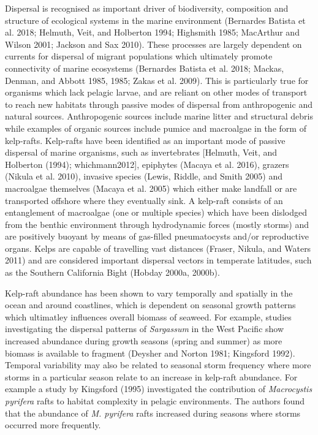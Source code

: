 \documentclass[
]{article}
\begin{document}
Dispersal is recognised as important driver of biodiversity, composition
and structure of ecological systems in the marine environment (Bernardes
Batista et al. 2018; Helmuth, Veit, and Holberton 1994; Highsmith 1985;
MacArthur and Wilson 2001; Jackson and Sax 2010). These processes are
largely dependent on currents for dispersal of migrant populations which
ultimately promote connectivity of marine ecosystems (Bernardes Batista
et al. 2018; Mackas, Denman, and Abbott 1985, 1985; Zakas et al. 2009).
This is particularly true for organisms which lack pelagic larvae, and
are reliant on other modes of transport to reach new habitats through
passive modes of dispersal from anthropogenic and natural sources.
Anthropogenic sources include marine litter and structural debris while
examples of organic sources include pumice and macroalgae in the form of
kelp-rafts. Kelp-rafts have been identified as an important mode of
passive dispersal of marine organisms, such as invertebrates {[}Helmuth,
Veit, and Holberton (1994); whichmann2012{]}, epiphytes (Macaya et al.
2016), grazers (Nikula et al. 2010), invasive species (Lewis, Riddle,
and Smith 2005) and macroalgae themselves (Macaya et al. 2005) which
either make landfall or are transported offshore where they eventually
sink. A kelp-raft consists of an entanglement of macroalgae (one or
multiple species) which have been dislodged from the benthic environment
through hydrodynamic forces (mostly storms) and are positively buoyant
by means of gas-filled pneumatocysts and/or reproductive organs. Kelps
are capable of travelling vast distances (Fraser, Nikula, and Waters
2011) and are considered important dispersal vectors in temperate
latitudes, such as the Southern California Bight (Hobday 2000a, 2000b).

Kelp-raft abundance has been shown to vary temporally and spatially in
the ocean and around coastlines, which is dependent on seasonal growth
patterns which ultimatley influences overall biomass of seaweed. For
example, studies investigating the dispersal patterns of
\emph{Sargassum} in the West Pacific show increased abundance during
growth seasons (spring and summer) as more biomass is available to
fragment (Deysher and Norton 1981; Kingsford 1992). Temporal variability
may also be related to seasonal storm frequency where more storms in a
particular season relate to an increase in kelp-raft abundance. For
example a study by Kingsford (1995) investigated the contribution of
\emph{Macrocystis pyrifera} rafts to habitat complexity in pelagic
environments. The authors found that the abundance of \emph{M. pyrifera}
rafts increased during seasons where storms occurred more frequently.
\end{document}
